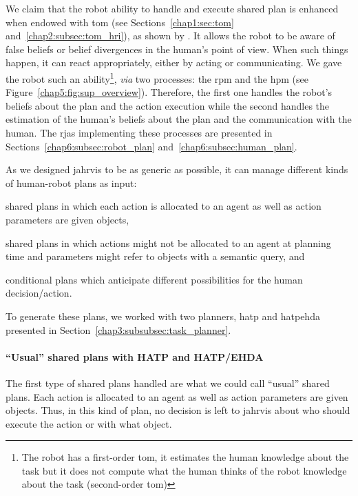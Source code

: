 \documentclass[a4paper,11pt,twoside]{StyleThese}
\begin{document}
We claim that the robot ability to handle and execute shared plan is enhanced when endowed with \acrfull{tom} (see Sections~\ref{chap1:sec:tom} and~\ref{chap2:subsec:tom_hri}), as shown by \cite{devin_2016_implemented}. It allows the robot to be aware of false beliefs or belief divergences in the human's point of view. When such things happen, it can react appropriately, either by acting or communicating. We gave the robot such an ability\footnote{The robot has a first-order \acrshort{tom}, it estimates the human knowledge about the task but it does not compute what the human thinks of the robot knowledge about the task (second-order \acrshort{tom})}, \textit{via} two processes: the \acrfull{rpm} and the \acrfull{hpm} (see Figure~\ref{chap5:fig:sup_overview}). Therefore, the first one handles the robot's beliefs about the plan and the action execution while the second handles the estimation of the human's beliefs about the plan and the communication with the human. The \acrshort{rja}s implementing these processes are presented in Sections~\ref{chap6:subsec:robot_plan} and~\ref{chap6:subsec:human_plan}.

As we designed \acrshort{jahrvis} to be as generic as possible, it can manage different kinds of human-robot plans as input: 
\begin{bulletList}
	\item shared plans in which each action is allocated to an agent as well as action parameters are given objects,
	\item shared plans in which actions might not be allocated to an agent at planning time and parameters might refer to objects with a semantic query, and
	\item conditional plans which anticipate different possibilities for the human decision/action. 
\end{bulletList} 

To generate these plans, we worked with two planners, \acrshort{hatp} and \acrshort{hatpehda} presented in Section~\ref{chap3:subsubsec:task_planner}.

\paragraph{``Usual'' shared plans with HATP and HATP/EHDA} The first type of shared plans handled are what we could call ``usual'' shared plans. Each action is allocated to an agent as well as action parameters are given objects. Thus, in this kind of plan, no decision is left to \acrshort{jahrvis} about who should execute the action or with what object.
\end{document}
